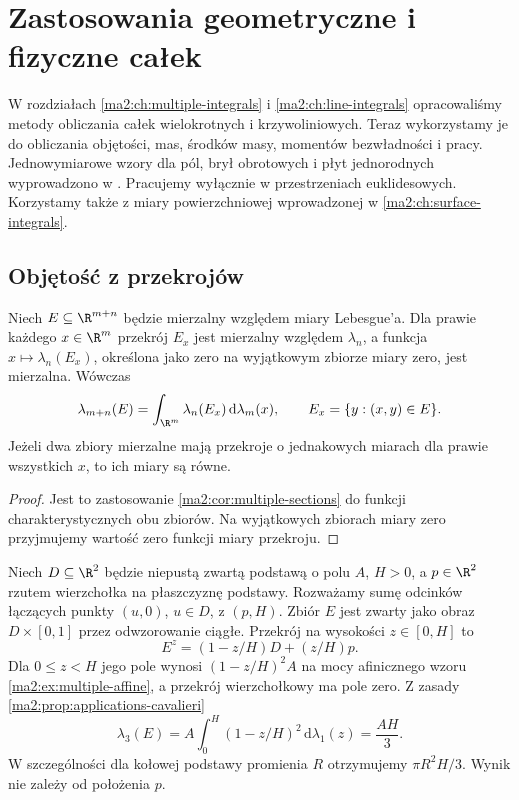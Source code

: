 \chapter{Zastosowania geometryczne i fizyczne całek}
\label{ma2:ch:integral-applications}

W rozdziałach \ref{ma2:ch:multiple-integrals}
i \ref{ma2:ch:line-integrals} opracowaliśmy
metody obliczania całek wielokrotnych i krzywoliniowych.
Teraz wykorzystamy je do obliczania objętości,
mas, środków masy, momentów bezwładności i pracy.
Jednowymiarowe wzory dla pól, brył obrotowych
i płyt jednorodnych wyprowadzono w
.
Pracujemy wyłącznie w przestrzeniach euklidesowych.
Korzystamy także z miary powierzchniowej
wprowadzonej w \ref{ma2:ch:surface-integrals}.

\section{Objętość z przekrojów}

\begin{stwierdzenie}
\label{ma2:prop:applications-cavalieri}
Niech $E\subseteq\R^{m+n}$ będzie mierzalny
względem miary Lebesgue'a. Dla prawie każdego
$x\in\R^m$ przekrój $E_x$ jest mierzalny
względem $\lambda_n$, a funkcja
$x\mapsto\lambda_n(E_x)$, określona jako zero
na wyjątkowym zbiorze miary zero, jest mierzalna.
Wówczas
\[
 \lambda_{m+n}(E)=
 \int_{\R^m}\lambda_n(E_x)\,\mathrm d\lambda_m(x),
 \qquad
 E_x=\{y:(x,y)\in E\}.
\]
Jeżeli dwa zbiory mierzalne mają przekroje
o jednakowych miarach dla prawie wszystkich $x$,
to ich miary są równe.
\end{stwierdzenie}
\begin{proof}
Jest to zastosowanie
\ref{ma2:cor:multiple-sections} do funkcji
charakterystycznych obu zbiorów.
Na wyjątkowych zbiorach miary zero przyjmujemy
wartość zero funkcji miary przekroju.
\end{proof}

\begin{przyklad}
\label{ma2:ex:applications-cone}
Niech $D\subseteq\R^2$ będzie niepustą zwartą podstawą
o polu $A$, $H>0$, a $p\in\R^2$ rzutem
wierzchołka na płaszczyznę podstawy.
Rozważamy sumę odcinków łączących
punkty $(u,0)$, $u\in D$, z $(p,H)$.
Zbiór $E$ jest zwarty jako obraz
$D\times[0,1]$ przez odwzorowanie ciągłe.
Przekrój na wysokości $z\in[0,H]$ to
\[
 E^z=(1-z/H)D+(z/H)p .
\]
Dla $0\le z<H$ jego pole wynosi
$(1-z/H)^2 A$ na mocy afinicznego wzoru
\ref{ma2:ex:multiple-affine}, a przekrój
wierzchołkowy ma pole zero. Z zasady
\ref{ma2:prop:applications-cavalieri}
\[
 \lambda_3(E)=A\int_0^H(1-z/H)^2\,
 \mathrm d\lambda_1(z)=\frac{AH}{3}.
\]
W szczególności dla kołowej podstawy
promienia $R$ otrzymujemy $\pi R^2H/3$.
Wynik nie zależy od położenia $p$.
\end{przyklad}

